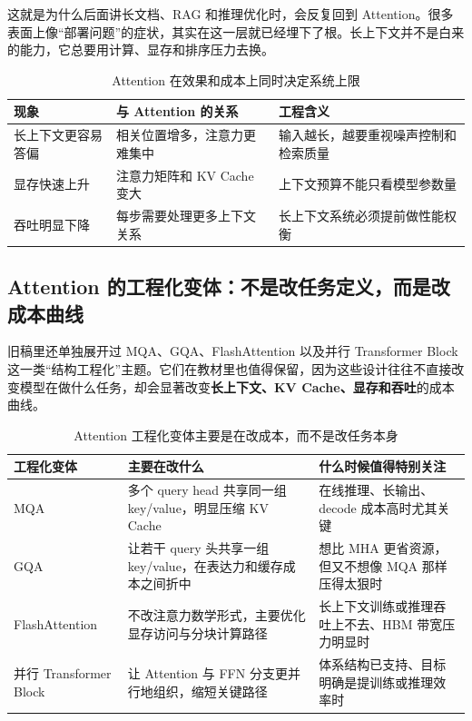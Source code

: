 这就是为什么后面讲长文档、RAG 和推理优化时，会反复回到 Attention。很多表面上像“部署问题”的症状，其实在这一层就已经埋下了根。长上下文并不是白来的能力，它总要用计算、显存和排序压力去换。

\begin{table}[H]
\centering
\small
\begin{tabularx}{\textwidth}{>{\raggedright\arraybackslash}p{2.9cm}>{\raggedright\arraybackslash}p{3cm}>{\raggedright\arraybackslash}X}
\toprule
\textbf{现象} & \textbf{与 Attention 的关系} & \textbf{工程含义} \\
\midrule
长上下文更容易答偏 & 相关位置增多，注意力更难集中 & 输入越长，越要重视噪声控制和检索质量 \\
显存快速上升 & 注意力矩阵和 KV Cache 变大 & 上下文预算不能只看模型参数量 \\
吞吐明显下降 & 每步需要处理更多上下文关系 & 长上下文系统必须提前做性能权衡 \\
\bottomrule
\end{tabularx}
\caption{Attention 在效果和成本上同时决定系统上限}
\label{tab:attention-cost}
\end{table}

\subsection{Attention 的工程化变体：不是改任务定义，而是改成本曲线}
旧稿里还单独展开过 MQA、GQA、FlashAttention 以及并行 Transformer Block 这一类“结构工程化”主题。它们在教材里也值得保留，因为这些设计往往不直接改变模型在做什么任务，却会显著改变\textbf{长上下文、KV Cache、显存和吞吐}的成本曲线。

\begin{table}[H]
\centering
\small
\begin{tabularx}{\textwidth}{>{\raggedright\arraybackslash}p{2.8cm}>{\raggedright\arraybackslash}p{3.1cm}>{\raggedright\arraybackslash}X}
\toprule
\textbf{工程化变体} & \textbf{主要在改什么} & \textbf{什么时候值得特别关注} \\
\midrule
MQA & 多个 query head 共享同一组 key/value，明显压缩 KV Cache & 在线推理、长输出、decode 成本高时尤其关键 \\
GQA & 让若干 query 头共享一组 key/value，在表达力和缓存成本之间折中 & 想比 MHA 更省资源，但又不想像 MQA 那样压得太狠时 \\
FlashAttention & 不改注意力数学形式，主要优化显存访问与分块计算路径 & 长上下文训练或推理吞吐上不去、HBM 带宽压力明显时 \\
并行 Transformer Block & 让 Attention 与 FFN 分支更并行地组织，缩短关键路径 & 体系结构已支持、目标明确是提训练或推理效率时 \\
\bottomrule
\end{tabularx}
\caption{Attention 工程化变体主要是在改成本，而不是改任务本身}
\label{tab:attention-engineering-variants}
\end{table}

